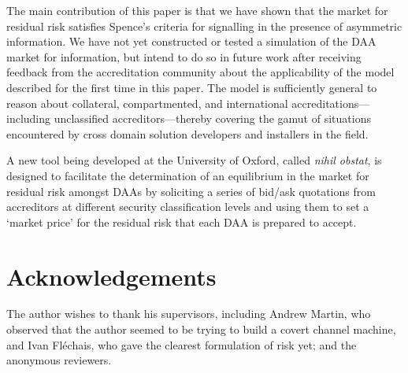 \documentclass{llncs}
\begin{document}
The main contribution of this paper is that we have shown that the market for
residual risk satisfies Spence's criteria for signalling in the presence of
asymmetric information.  We have not yet constructed or tested a simulation
of the DAA market for information, but intend to do so in future work
after receiving feedback from the accreditation community about the
applicability of the model described for the first time in this paper.  The
model is sufficiently general to reason about collateral, compartmented, and
international accreditations---including unclassified accreditors---thereby
covering the gamut of situations encountered by cross domain solution developers
and installers in the field.

A new tool being developed at the University of Oxford, called {\it nihil obstat},
is designed to facilitate the determination of an equilibrium in the market for
residual risk amongst DAAs by soliciting a series of bid/ask quotations from
accreditors at different security classification levels and using them to set a
`market price' for the residual risk that each DAA is prepared to accept.


\section*{Acknowledgements}

The author wishes to thank his supervisors, including Andrew Martin, who observed
that the author seemed to be trying to build a covert channel machine, and Ivan
Fl\'echais, who gave the clearest formulation of risk yet; and the anonymous
reviewers.


\end{document}
